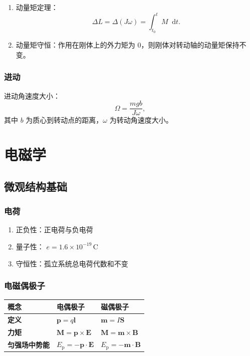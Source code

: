 \documentclass[UTF8,fontset=fandol,zihao=5]{ctexart}
\newcommand{\vect}[1]{\bm{#1}}
\newcommand{\dif}{\mathop{}\!\mathrm{d}}
\begin{document}
\begin{enumerate}
  \item 动量矩定理：
  \[
    \Delta L=\Delta(J\omega)=\int_{t_0}^{t}M\dif t.
  \]
  \item 动量矩守恒：作用在刚体上的外力矩为 0，则刚体对转动轴的动量矩保持不变。
\end{enumerate}

\subsubsection{进动}

进动角速度大小：
\[
  \Omega=\frac{mgb}{J\omega},
\]
其中 \(b\) 为质心到转动点的距离，\(\omega\) 为转动角速度大小。

\section{电磁学}

\subsection{微观结构基础}

\subsubsection{电荷}

\begin{enumerate}
  \item 正负性：正电荷与负电荷
  \item 量子性： \(e=1.6\times10^{-19}\,\mathrm C\)
  \item 守恒性：孤立系统总电荷代数和不变
\end{enumerate}

\subsubsection{电磁偶极子}

\begin{center}
\begin{tabularx}{0.98\textwidth}{>{\bfseries}p{1.5cm}X X}
\toprule
概念 & 电偶极子 & 磁偶极子 \\
\midrule
定义 & \(\vect p=q\vect l\) & \(\vect m=I\vect S\) \\
力矩 & \(\vect M=\vect p\times\vect E\) & \(\vect M=\vect m\times\vect B\) \\
匀强场中势能 & \(E_{\mathrm p}=-\vect p\cdot\vect E\) & \(E_{\mathrm p}=-\vect m\cdot\vect B\) \\
\bottomrule
\end{tabularx}
\end{center}
\end{document}
